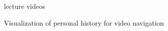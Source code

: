lecture videos~\cite{Tang:2006:DIU:1111449.1111523}

Visualization of personal history for video navigation~\cite{Al-Hajri:2014:VPH:2611105.2557106}


